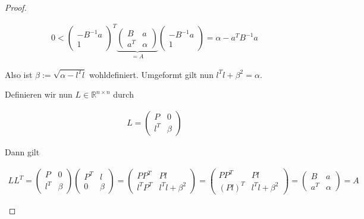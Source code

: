 \documentclass[titlepage]{article}
\begin{document}
\begin{proof}
\begin{itemize}
		\begin{align*}
			0 < \begin{pmatrix}
				-B^{-1}a\\
				1
			\end{pmatrix}^T
			\underbrace{\begin{pmatrix}
				B & a\\
				a^T & \alpha
			\end{pmatrix}}_{=A}
			\begin{pmatrix}
				-B^{-1}a\\
				1
			\end{pmatrix} =
			\alpha - a^T B^{-1} a
		\end{align*}
	
		Also ist $\beta := \sqrt{\alpha - l^Tl}$ wohldefiniert. Umgeformt gilt nun $l^Tl + \beta^2 = \alpha$.
		
		Definieren wir nun $L \in \mathbb{R}^{n\times n}$ durch
		
		\begin{align*}
			L = \begin{pmatrix}
				P & 0 \\
				l^T & \beta
			\end{pmatrix}
		\end{align*}
	
		Dann gilt
		
		\begin{align*}
			LL^T = \begin{pmatrix}
				P & 0 \\
				l^T & \beta
			\end{pmatrix} \begin{pmatrix}
				P^T & l \\
				0 & \beta
			\end{pmatrix} = \begin{pmatrix}
				PP^T & Pl \\
				l^TP^T & l^Tl+\beta^2
			\end{pmatrix} = \begin{pmatrix}
				PP^T & Pl \\
				(Pl)^T & l^Tl+\beta^2
			\end{pmatrix} = \begin{pmatrix}
				B & a \\
				a^T & \alpha
			\end{pmatrix} = A
		\end{align*}
	\end{itemize}
	
\end{proof}
\end{document}
